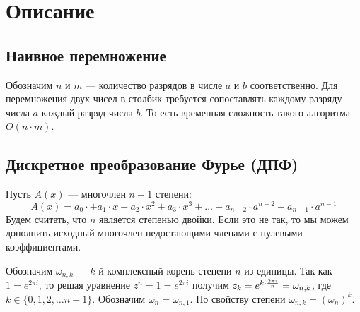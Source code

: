 \graphicspath{{png/}}

\section{Описание}

\subsection*{Наивное перемножение}

Обозначим $n$ и $m$ --- количество разрядов в числе $a$ и $b$ соответственно. Для перемножения двух чисел в столбик требуется сопоставлять каждому разряду числа $a$ каждый разряд числа $b$. То есть временная сложность такого алгоритма $O(n \cdot m)$.

\subsection*{Дискретное преобразование Фурье (ДПФ)}

Пусть $A(x)$ --- многочлен $n - 1$ степени:
$$A(x) = a_0 \cdot + a_1 \cdot x + a_2 \cdot x^2 + a_3 \cdot x^3 + \dots + a_{n - 2} \cdot a ^ {n - 2} + a_{n - 1} \cdot a ^ {n - 1}$$
Будем считать, что $n$ является степенью двойки. Если это не так, то мы можем дополнить исходный многочлен недостающими членами с нулевыми коэффициентами.

Обозначим $\omega_{n, k}$ --- $k$-й комплексный корень степени $n$ из единицы. Так как $1 = e ^ {2 \pi i}$, то решая уравнение $z ^ n = 1 = e ^ {2 \pi i}$ получим $z_k = e ^ {k \cdot {{2 \pi i} \over {n}}} = \omega_{n, k}$, где $k \in \{0, 1, 2, \dots n - 1 \}$. Обозначим $\omega_n = \omega_{n, 1}$. По свойству степени $\omega_{n, k} = (\omega_n) ^ k$.

